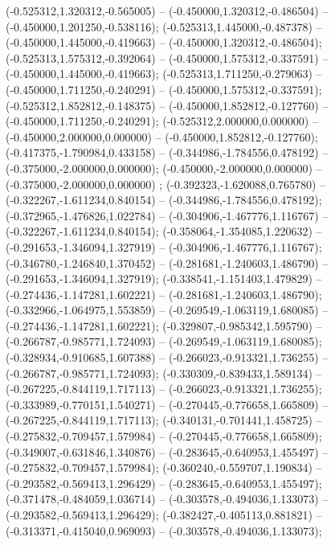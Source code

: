  (-0.525312,1.320312,-0.565005) -- (-0.450000,1.320312,-0.486504) -- (-0.450000,1.201250,-0.538116);
 (-0.525313,1.445000,-0.487378) -- (-0.450000,1.445000,-0.419663) -- (-0.450000,1.320312,-0.486504);
 (-0.525313,1.575312,-0.392064) -- (-0.450000,1.575312,-0.337591) -- (-0.450000,1.445000,-0.419663);
 (-0.525313,1.711250,-0.279063) -- (-0.450000,1.711250,-0.240291) -- (-0.450000,1.575312,-0.337591);
 (-0.525312,1.852812,-0.148375) -- (-0.450000,1.852812,-0.127760) -- (-0.450000,1.711250,-0.240291);
 (-0.525312,2.000000,0.000000) -- (-0.450000,2.000000,0.000000) -- (-0.450000,1.852812,-0.127760);
 (-0.417375,-1.790984,0.433158) -- (-0.344986,-1.784556,0.478192) -- (-0.375000,-2.000000,0.000000);
 (-0.450000,-2.000000,0.000000) -- (-0.375000,-2.000000,0.000000) ;
 (-0.392323,-1.620088,0.765780) -- (-0.322267,-1.611234,0.840154) -- (-0.344986,-1.784556,0.478192);
 (-0.372965,-1.476826,1.022784) -- (-0.304906,-1.467776,1.116767) -- (-0.322267,-1.611234,0.840154);
 (-0.358064,-1.354085,1.220632) -- (-0.291653,-1.346094,1.327919) -- (-0.304906,-1.467776,1.116767);
 (-0.346780,-1.246840,1.370452) -- (-0.281681,-1.240603,1.486790) -- (-0.291653,-1.346094,1.327919);
 (-0.338541,-1.151403,1.479829) -- (-0.274436,-1.147281,1.602221) -- (-0.281681,-1.240603,1.486790);
 (-0.332966,-1.064975,1.553859) -- (-0.269549,-1.063119,1.680085) -- (-0.274436,-1.147281,1.602221);
 (-0.329807,-0.985342,1.595790) -- (-0.266787,-0.985771,1.724093) -- (-0.269549,-1.063119,1.680085);
 (-0.328934,-0.910685,1.607388) -- (-0.266023,-0.913321,1.736255) -- (-0.266787,-0.985771,1.724093);
 (-0.330309,-0.839433,1.589134) -- (-0.267225,-0.844119,1.717113) -- (-0.266023,-0.913321,1.736255);
 (-0.333989,-0.770151,1.540271) -- (-0.270445,-0.776658,1.665809) -- (-0.267225,-0.844119,1.717113);
 (-0.340131,-0.701441,1.458725) -- (-0.275832,-0.709457,1.579984) -- (-0.270445,-0.776658,1.665809);
 (-0.349007,-0.631846,1.340876) -- (-0.283645,-0.640953,1.455497) -- (-0.275832,-0.709457,1.579984);
 (-0.360240,-0.559707,1.190834) -- (-0.293582,-0.569413,1.296429) -- (-0.283645,-0.640953,1.455497);
 (-0.371478,-0.484059,1.036714) -- (-0.303578,-0.494036,1.133073) -- (-0.293582,-0.569413,1.296429);
 (-0.382427,-0.405113,0.881821) -- (-0.313371,-0.415040,0.969093) -- (-0.303578,-0.494036,1.133073);
